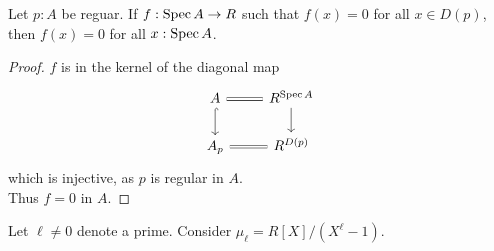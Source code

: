 \begin{lemma}{\label{lemma:AlmostEverywhere}}
	Let $p : A$ be reguar. If $f : \operatorname{Spec} A \to R$ such that $f(x) = 0$ for all $x \in D(p)$, then $f(x) = 0$ for all $x : \operatorname{Spec} A$.
\end{lemma}
\begin{proof}
	$f$ is in the kernel of the diagonal map
\[\begin{tikzcd}
	{A} & {R^{\Spec A}} \\
	{A_p} & {R^{D(p)}}
	\arrow[hook, from=1-1, to=2-1]
	\arrow[Rightarrow, no head, from=1-2, to=1-1]
	\arrow[from=1-2, to=2-2]
	\arrow[Rightarrow, no head, from=2-2, to=2-1]
\end{tikzcd}\]
	which is injective, as $p$ is regular in $A$. \\
	Thus $f = 0$ in $A$.
\end{proof}
Let $\ell \neq 0$ denote a prime. Consider $\mu_\ell = R[X] / (X^\ell - 1)$.

